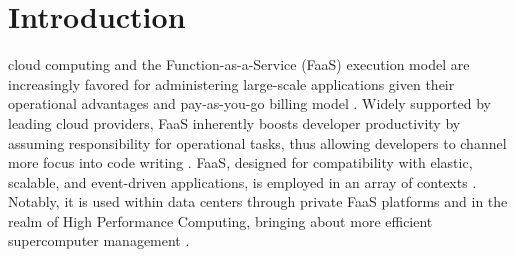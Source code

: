 \section{Introduction}\label{sec:introduction}


 cloud computing and the Function-as-a-Service (FaaS)
execution model are increasingly favored for administering large-scale
applications given their operational advantages and pay-as-you-go billing model
\cite{hendrickson2016serverless, bermbach2021future}. Widely supported by
leading cloud providers, FaaS inherently boosts developer productivity by
assuming responsibility for operational tasks, thus allowing developers to
channel more focus into code writing \cite{bermbach2021future}. FaaS, designed
for compatibility with elastic, scalable, and event-driven applications, is
employed in an array of contexts \cite{eismann2020serverless,
hendrickson2016serverless}. Notably, it is used within data centers through
private FaaS platforms \cite{eismann2020review} and in the realm of High
Performance Computing, bringing about more efficient supercomputer management
\cite{spillner2018faaster, chard2020funcx}.


